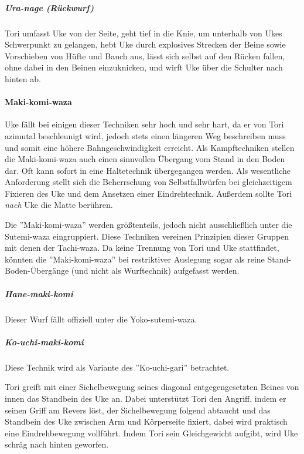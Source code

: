 \documentclass[justified, a4paper, notitlepage, captions=tableheading, nobib]{tufte-handout}
\begin{document}
\subparagraph{Ura-nage (Rückwurf)}
\label{sec:org5add1c0}

Tori umfasst Uke von der Seite, geht tief in die Knie, um unterhalb von Ukes Schwerpunkt zu gelangen, hebt Uke durch explosives Strecken der Beine sowie Vorschieben von Hüfte und Bauch aus, lässt sich selbst auf den Rücken fallen, ohne dabei in den Beinen einzuknicken, und wirft Uke über die Schulter nach hinten ab.

\paragraph{Maki-komi-waza}
\label{sec:org806922c}

Uke fällt bei einigen dieser Techniken sehr hoch und sehr hart, da er von Tori azimutal beschleunigt wird, jedoch stets einen längeren Weg beschreiben muss und somit eine höhere Bahngeschwindigkeit erreicht. Als Kampftechniken stellen die Maki-komi-waza auch einen sinnvollen Übergang vom Stand in den Boden dar. Oft kann sofort in eine Haltetechnik übergegangen werden. Als wesentliche Anforderung stellt sich die Beherrschung von Selbstfallwürfen bei gleichzeitigem Fixieren des Uke und dem Ansetzen einer Eindrehtechnik. Außerdem sollte Tori \emph{nach} Uke die Matte berühren.

Die ''Maki-komi-waza'' werden größtenteils, jedoch nicht ausschließlich unter die Sutemi-waza eingruppiert. Diese Techniken vereinen Prinzipien dieser Gruppen mit denen der Tachi-waza. Da keine Trennung von Tori und Uke stattfindet, könnten die ''Maki-komi-waza'' bei restriktiver Auslegung sogar als reine Stand-Boden-Übergänge (und nicht als Wurftechnik) aufgefasst werden.

\subparagraph{Hane-maki-komi}
\label{sec:org2e53690}

Dieser Wurf fällt offiziell unter die Yoko-sutemi-waza.

\subparagraph{Ko-uchi-maki-komi}
\label{sec:org902863a}

Diese Technik wird als Variante des ''Ko-uchi-gari'' betrachtet.

Tori greift mit einer Sichelbewegung seines diagonal entgegengesetzten Beines von innen das Standbein des Uke an. Dabei unterstützt Tori den Angriff, indem er seinen Griff am Revers löst, der Sichelbewegung folgend abtaucht und das Standbein des Uke zwischen Arm und Körperseite fixiert, dabei wird praktisch eine Eindrehbewegung vollführt. Indem Tori sein Gleichgewicht aufgibt, wird Uke schräg nach hinten geworfen.
\end{document}
